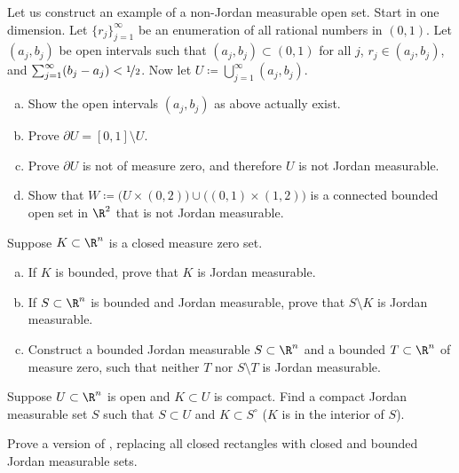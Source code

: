 \begin{exercise}
Let us construct an example of a non-Jordan measurable open set.
Start in one dimension.  Let $\{ r_j \}_{j=1}^\infty$ be an enumeration
of all rational numbers in $(0,1)$.  Let $(a_j,b_j)$ be open intervals
such that $(a_j,b_j) \subset (0,1)$ for all $j$, $r_j \in (a_j,b_j)$,
and $\sum_{j=1}^\infty (b_j-a_j) < \nicefrac{1}{2}$.  Now let $U \coloneqq
\bigcup_{j=1}^\infty (a_j,b_j)$.
\begin{enumerate}[a)]
\item
Show the open intervals $(a_j,b_j)$ as above actually exist.
\item
Prove $\partial U = [0,1] \setminus U$.
\item
Prove $\partial U$ is not of measure zero, and therefore $U$ is not Jordan measurable.
\item
Show that $W \coloneqq
\bigl( U \times (0,2) \bigr) \cup \bigl( (0,1) \times (1,2) \bigr)$
is a connected bounded open set in $\R^2$
that is not Jordan measurable.
\end{enumerate}
\end{exercise}

\begin{exercise}
Suppose $K \subset \R^n$ is a closed measure zero set.
\begin{enumerate}[a)]
\item
If $K$ is bounded, prove that $K$ is Jordan measurable.
\item
If $S \subset \R^n$ is bounded and Jordan measurable, prove that
$S \setminus K$ is Jordan measurable.
\item
Construct a bounded Jordan measurable $S \subset \R^n$
and a bounded $T \subset \R^n$ of measure zero, such that
neither $T$ nor $S \setminus T$ is Jordan measurable.
\end{enumerate}
\end{exercise}

\begin{exercise}
Suppose $U \subset \R^n$ is open and $K \subset U$ is compact.
Find a compact Jordan measurable set $S$ such that $S \subset U$
and $K \subset S^\circ$ ($K$ is in the interior of $S$).
\end{exercise}

\begin{exercise} \label{exercise:closednessofriemannintegrable}
Prove a version of , replacing all closed
rectangles with closed and bounded Jordan measurable sets.
\end{exercise}

